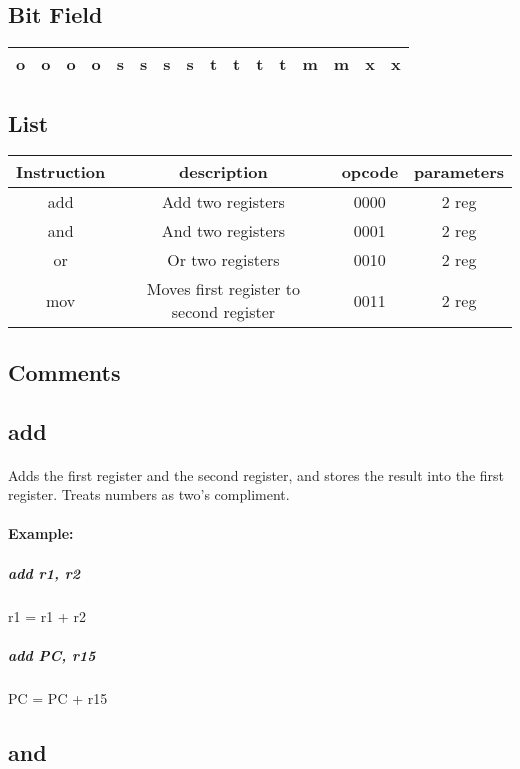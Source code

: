 \documentclass[a4paper]{article}
\begin{document}
\subsection{Bit Field}

\begin{center}
\begin{tabular}{| c | c | c | c | c | c | c | c | c | c | c | c | c | c | c | c |}
\hline
o&o&o&o&s&s&s&s&t&t&t&t&m&m&x&x\\ \hline
\end{tabular}
\end{center}

\subsection{List}
\begin{center}
\begin{tabular}{| c | c | c | c |}
\hline
Instruction & description & opcode & parameters \\ \hline
add & Add two registers & 0000 & 2 reg \\ \hline
and & And two registers & 0001 & 2 reg \\ \hline
or & Or two registers & 0010 & 2 reg \\ \hline
mov & Moves first register to second register & 0011 & 2 reg \\ \hline
\end{tabular}
\end{center}

\subsection{Comments}
\subsection{add}
\paragraph{} Adds the first register and the second register, and stores the result into the first register. Treats numbers as two's compliment. 
\paragraph{Example:} 
\subparagraph{add r1, r2} r1 = r1 + r2
\subparagraph{add PC, r15} PC = PC + r15

\subsection{and}
\end{document}
